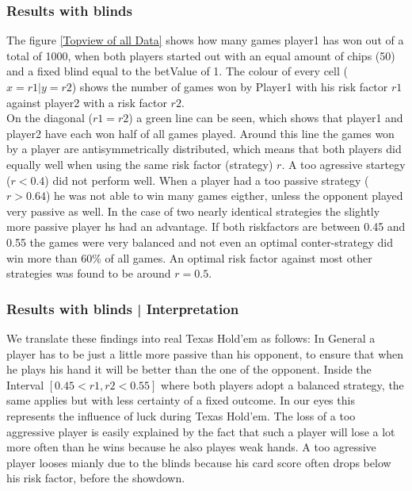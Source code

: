 \documentclass[11pt]{article}
\begin{document}
\subsubsection{Results with blinds}
The figure \ref{Topview of all Data} shows how many games player1 has won out of a total of 1000, when both players started out with an equal amount of chips (50) and a fixed blind equal to the betValue of 1. The colour of every cell ($x=r1|y=r2$) shows the number of games won by Player1 with his risk factor $r1$ against player2 with a risk factor $r2$.\\
On the diagonal ($r1=r2$) a green line can be seen, which shows that player1 and player2 have each won half of all games played. Around this line the games won by a player are antisymmetrically distributed, which means that both players did equally well when using the same risk factor (strategy) $r$.
A too agressive startegy ($r < 0.4$) did not perform well. When a player had a too passive strategy ($r > 0.64$) he was not able to win many games eigther, unless the opponent played very passive as well. In the case of two nearly identical strategies the slightly more passive player hs had an advantage.
If both riskfactors are between 0.45 and 0.55 the games were very balanced and not even an optimal conter-strategy did win more than 60\% of all games. An optimal risk factor against most other strategies was found to be around $r=0.5$. \\
\subsubsection{Results with blinds | Interpretation}

We translate these findings into real Texas Hold’em as follows: In General a player has to be just a little more passive than his opponent, to ensure that when he plays his hand it will be better than the one of the opponent.
Inside the Interval $[0.45 < r1,r2 < 0.55]$ where both players adopt a balanced strategy, the same applies but with less certainty of a fixed outcome. In our eyes this represents the influence of luck during Texas Hold’em. The loss of a too aggressive player is easily explained by the fact that such a player will lose a lot more often than he wins because he also playes weak hands. A too agressive player looses mianly due to the blinds because his card score often drops below his risk factor, before the showdown.
\end{document}
